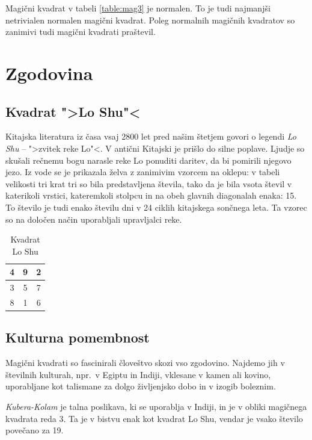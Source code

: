 \documentclass[a4paper,12pt]{article}
\newenvironment{magic}[3]
{
    \begin{table}[!ht]
    \centering
    \caption{#2}
    \label{#3}
    \large
    \begin{tabular}{|*{#1}{c|}}
    \hline
}
{
    \end{tabular}
    \normalsize
    \end{table}
}
\theoremstyle{definition}
\theoremstyle{plain}
\begin{document}
Magični kvadrat v tabeli \ref{table:mag3} je normalen.
To je tudi najmanjši netrivialen normalen magični kvadrat.
Poleg normalnih magičnih kvadratov so zanimivi tudi magični kvadrati praštevil.


\section{Zgodovina}

\subsection{Kvadrat ">Lo Shu"<}

Kitajska literatura iz časa vsaj 2800 let pred našim štetjem govori o legendi
\emph{Lo Shu} -- ">zvitek reke Lo"<. V antični Kitajski je prišlo do
silne poplave. Ljudje so skušali rečnemu bogu narasle reke Lo ponuditi daritev,
da bi pomirili njegovo jezo. Iz vode se je prikazala želva z zanimivim vzorcem
na oklepu: v tabeli velikosti tri krat tri so bila predstavljena števila, tako
da je bila vsota števil v katerikoli vrstici, kateremkoli stolpcu in na obeh
glavnih diagonalah enaka: 15. To število je tudi enako številu dni v 24 ciklih
kitajskega sončnega leta. Ta vzorec so na določen način uporabljali upravljalci
reke.

\begin{magic}{3}{Kvadrat Lo Shu}{table:loshu}
   4 & 9 & 2 \\ \hline
   3 & 5 & 7 \\ \hline
   8 & 1 & 6 \\ \hline
\end{magic}

\subsection{Kulturna pomembnost}

Magični kvadrati so fascinirali človeštvo skozi vso zgodovino. Najdemo jih
v številnih kulturah, npr.\ v Egiptu in Indiji, vklesane v kamen ali
kovino, uporabljane kot talismane za dolgo življenjsko dobo in v
izogib boleznim.

\emph{Kubera-Kolam} je talna poslikava, ki se uporablja v Indiji, in je v
obliki magičnega kvadrata reda 3. Ta je v bistvu enak kot kvadrat
Lo Shu, vendar je vsako število povečano za 19.
\end{document}
